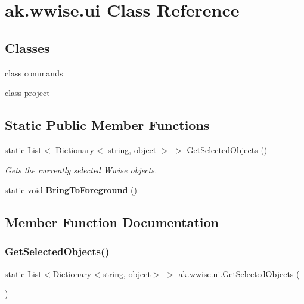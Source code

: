 \hypertarget{classak_1_1wwise_1_1ui}{}\section{ak.\+wwise.\+ui Class Reference}
\label{classak_1_1wwise_1_1ui}
\subsection*{Classes}
\begin{DoxyCompactItemize}
\item 
class \mbox{\hyperlink{classak_1_1wwise_1_1ui_1_1commands}{commands}}
\item 
class \mbox{\hyperlink{classak_1_1wwise_1_1ui_1_1project}{project}}
\end{DoxyCompactItemize}
\subsection*{Static Public Member Functions}
\begin{DoxyCompactItemize}
\item 
static List$<$ Dictionary$<$ string, object $>$ $>$ \mbox{\hyperlink{classak_1_1wwise_1_1ui_a3b93f048e8f2523e73c90e6a1def69a0}{Get\+Selected\+Objects}} ()
\begin{DoxyCompactList}\small\item\em Gets the currently selected Wwise objects. \end{DoxyCompactList}\item 
\mbox{\label{classak_1_1wwise_1_1ui_a9a3d67fa03de11ef4f74553f19db141c}} 
static void {\bfseries Bring\+To\+Foreground} ()
\end{DoxyCompactItemize}


\subsection{Member Function Documentation}
\mbox{\label{classak_1_1wwise_1_1ui_a3b93f048e8f2523e73c90e6a1def69a0}} 
\subsubsection{\texorpdfstring{Get\+Selected\+Objects()}{GetSelectedObjects()}}
{\footnotesize\ttfamily static List$<$Dictionary$<$string, object$>$ $>$ ak.\+wwise.\+ui.\+Get\+Selected\+Objects (\begin{DoxyParamCaption}{ }\end{DoxyParamCaption})\hspace{0.3cm}{\ttfamily [static]}}



